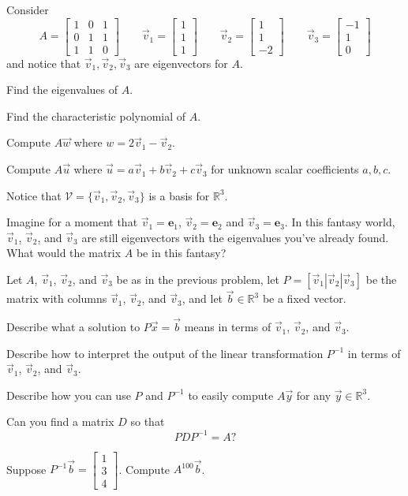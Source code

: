 \documentclass[14pt]{problemset}
\newcommand{\xh}{{{\mathbf e}_1}}
\newcommand{\yh}{{{\mathbf e}_2}}
\newcommand{\zh}{{{\mathbf e}_3}}
\newcommand{\R}{\mathbb{R}}
\newcommand{\mat}[1]{\begin{bmatrix}#1\end{bmatrix}}
\begin{document}
	\question
	Consider
	\[
		A=\mat{1&0&1\\0&1&1\\1&1&0}\qquad
		\vec v_1=\mat{1\\1\\1}\qquad
		\vec v_2=\mat{1\\1\\-2}\qquad
		\vec v_3=\mat{-1\\1\\0}
	\]
	and notice that $\vec v_1,\vec v_2,\vec v_3$ are eigenvectors for $A$.
	\begin{parts}
		\item Find the eigenvalues of $A$.
		\item Find the characteristic polynomial of $A$.
		\item Compute $A\vec w$ where $w=2\vec v_1-\vec v_2$.
		\item Compute $A\vec u$ where $\vec u=a\vec v_1+b\vec v_2+c\vec v_3$ for
			unknown scalar coefficients $a,b,c$.
	\end{parts}
	Notice that $\mathcal V=\{\vec v_1,\vec v_2,\vec v_3\}$ is a basis for $\R^3$.
	\begin{parts}[resume]
	\item Imagine for a moment that $\vec v_1=\xh$, $\vec v_2=\yh$ and $\vec v_3=\zh$.
		In this fantasy world, $\vec v_1$, $\vec v_2$, and $\vec v_3$
		are still eigenvectors with the eigenvalues you've already found.
		What would the matrix $A$ be in this fantasy?
	\end{parts}
	
	\question
	Let $A$, $\vec v_1$, $\vec v_2$, and $\vec v_3$ be as in the previous problem, let
	$P=[\vec v_1|\vec v_2|\vec v_3]$ be the matrix with columns $\vec v_1$, $\vec v_2$, and $\vec v_3$,
	and
	let $\vec b\in\R^3$ be a fixed vector.
	\begin{parts}
		\item Describe what a solution to $P\vec x=\vec b$ means in terms of $\vec v_1$, $\vec v_2$,
			and $\vec v_3$.
		\item Describe how to interpret the output of the linear transformation
			$P^{-1}$ in terms of $\vec v_1$, $\vec v_2$, and $\vec v_3$.
		\item Describe how you can use $P$ and $P^{-1}$ to easily compute
			$A\vec y$ for any $\vec y\in \R^3$.
		\item Can you find a matrix $D$ so that
			\[
				PDP^{-1}=A?
			\]
		\item Suppose $P^{-1}\vec b=\mat{1\\3\\4}$.  Compute $A^{100}\vec b$.
	\end{parts}
\end{document}

